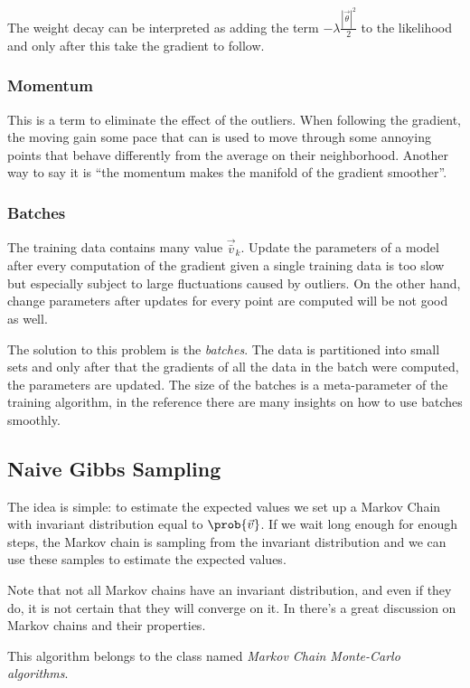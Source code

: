   The weight decay can be interpreted as adding the term \(-\lambda\frac{\left|\vec{\theta}\right|^2}{2}\)
  to the likelihood and only after this take the gradient to follow.
  \subsubsection{Momentum}
  This is a term to eliminate the effect of the outliers. When following the gradient,
  the moving gain some pace that can is used to move through some annoying points that
  behave differently from the average on their neighborhood. Another way to say it is
  ``the momentum makes the manifold of the gradient smoother''.
  
  \subsubsection{Batches}
  The training data contains many value \(\vec{\bar{v}}_k\). Update the parameters of a model
  after every computation of the gradient given a single training data is too slow but
  especially subject to large fluctuations caused by outliers. On the other hand, change
  parameters after updates for every point are computed will be not good as well.
  
  The solution to this problem is the \emph{batches}. The data is partitioned into small sets
  and only after that the gradients of all the data in the batch were computed, the parameters
  are updated. The size of the batches is a meta-parameter of the training algorithm, in 
  the reference \cite{hinton2012practical} there are many insights on how to use batches smoothly.
  
  
  \subsection{Naive Gibbs Sampling}
  The idea is simple: to estimate the expected values we set up a
  Markov Chain with invariant distribution equal to \(\prob{\vec{v}}\).
  If we wait long enough for enough steps, the Markov chain is sampling from the 
  invariant distribution and we can use these samples to estimate the
  expected values.
  
  Note that not all Markov chains have an invariant distribution, and even if they do,
  it is not certain that they will converge on it. In \cite{fischer2012introduction} there's 
  a great discussion on Markov chains and their properties.
  
  This algorithm belongs to the class named \emph{Markov Chain Monte-Carlo algorithms}.
  
